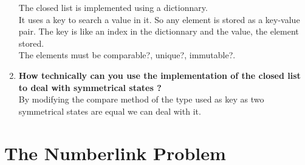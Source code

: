 \documentclass[10pt,a4paper]{article}
\begin{document}
\begin{enumerate}
	The closed list is implemented using a dictionnary.\\
	It uses a key to search a value in it. So any element is stored as a key-value pair. The key is like an index in the dictionnary and the value, the element stored.\\
	
	The elements must be comparable?, unique?, immutable?.
	
	\item \textbf{How technically can you use the implementation of the closed list to deal with symmetrical states ? }\\
	
	By modifying the compare method of the type used as key as two symmetrical states are equal we can deal with it.
		
\end{enumerate}

\section{The Numberlink Problem}
\end{document}
